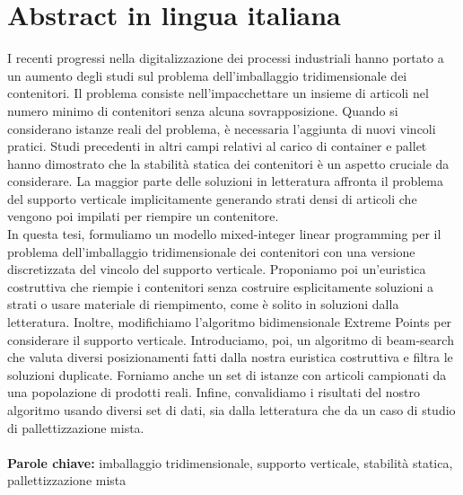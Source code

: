 
\chapter*{Abstract in lingua italiana}
I recenti progressi nella digitalizzazione dei processi industriali hanno portato a un aumento degli studi sul problema dell'imballaggio tridimensionale dei contenitori.
Il problema consiste nell'impacchettare un insieme di articoli nel numero minimo di contenitori senza alcuna sovrapposizione.
Quando si considerano istanze reali del problema, è necessaria l'aggiunta di nuovi vincoli pratici.
Studi precedenti in altri campi relativi al carico di container e pallet hanno dimostrato che la stabilità statica dei contenitori è un aspetto cruciale da considerare.
La maggior parte delle soluzioni in letteratura affronta il problema del supporto verticale implicitamente generando strati densi di articoli che vengono poi impilati per riempire un contenitore.
\\
In questa tesi, formuliamo un modello mixed-integer linear programming per il problema dell'imballaggio tridimensionale dei contenitori con una versione discretizzata del vincolo del supporto verticale.
Proponiamo poi un'euristica costruttiva che riempie i contenitori senza costruire esplicitamente soluzioni a strati o usare materiale di riempimento, come è solito in soluzioni dalla letteratura.
Inoltre, modifichiamo l'algoritmo bidimensionale Extreme Points per considerare il supporto verticale.
Introduciamo, poi, un algoritmo di beam-search che valuta diversi posizionamenti fatti dalla nostra euristica costruttiva e filtra le soluzioni duplicate.
Forniamo anche un set di istanze con articoli campionati da una popolazione di prodotti reali.
Infine, convalidiamo i risultati del nostro algoritmo usando diversi set di dati, sia dalla letteratura che da un caso di studio di pallettizzazione mista.
\\
\\
\textbf{Parole chiave:} imballaggio tridimensionale, supporto verticale, stabilità statica, pallettizzazione mista %